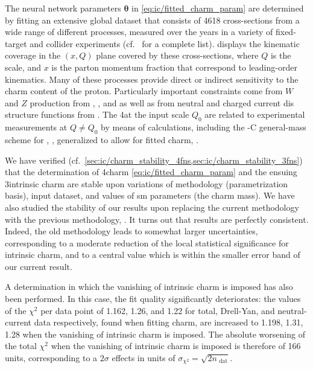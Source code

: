 The neural network parameters ${\boldsymbol \theta}$ in
\cref{eq:ic/fitted_charm_param} are determined by fitting an extensive global
dataset that consists of 4618  cross-sections from a wide range of different
processes, measured over the years in a variety of fixed-target and collider
experiments  (cf.\ \cite{Ball:2021leu} for a complete list).
%
 displays the kinematic coverage in the $(x,Q)$ plane
covered by these cross-sections, where $Q$ is the  scale, and  $x$ is the
parton momentum fraction that correspond to leading-order kinematics.
%
Many of these processes provide direct or indirect sensitivity  to the charm
content of the proton.
%
Particularly important constraints come from $W$ and $Z$ production from 
\atlas, \cms, and \lhcb as well as from neutral and charged current
\acrfull{dis} structure functions from \hera.
%
The 4\fns  \pdfs at the input scale $Q_0$ are related to experimental
measurements at $Q \not =Q_0$ by means of \nnlo \qcd calculations, including
the \fonll-C general-mass scheme for \dis, \cite{Forte:2010ta}, generalized to 
allow for fitted charm, \cite{Ball:2015tna}.

We have verified (cf.\
\cref{sec:ic/charm_stability_4fns,sec:ic/charm_stability_3fns}) that the
determination of 4\fns charm \pdf \cref{eq:ic/fitted_charm_param} and the
ensuing 3\fns intrinsic charm \pdf are  stable upon variations of methodology
(\pdf parametrization basis), input dataset, and values of \acrlong{sm}
parameters (the charm mass).
We have also studied the stability of our results upon replacing the current
\nnpdfr{4.0} methodology~\cite{Ball:2021leu} with the previous \nnpdfr{3.1}
methodology, \cite{NNPDF:2017mvq}. 
It turns out that results are  perfectly consistent.
Indeed, the old methodology leads to somewhat larger uncertainties,
corresponding to a moderate reduction of the local statistical significance for
intrinsic charm, and to a central value which is within the smaller  error band
of our current result.


A determination in which the vanishing of intrinsic charm is imposed has also
been performed.
%
In this case, the fit quality significantly deteriorates: the values of the
$\chi^2$ per data point of 1.162, 1.26, and 1.22 for total, Drell-Yan,  and
neutral-current \dis data respectively, found when fitting charm, are  increased
to 1.198, 1.31, 1.28 when the vanishing of intrinsic charm is imposed.
%
The absolute worsening of the total $\chi^2$ when the vanishing of intrinsic
charm is imposed is therefore of 166 units, corresponding to a $2\sigma$
effects in units of $\sigma_{\chi^2}= \sqrt{2n_\textrm{ dat}}$.

